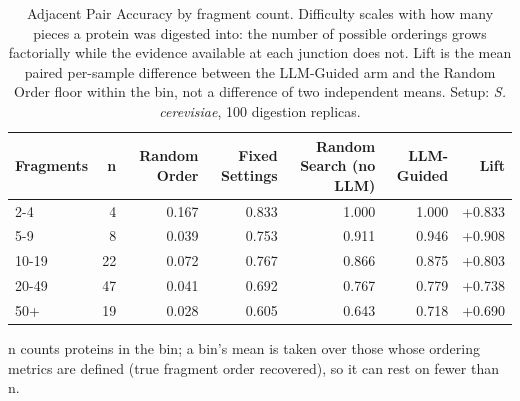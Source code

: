 \begin{table}[!tb]
  \centering
  \caption{Adjacent Pair Accuracy by fragment count. Difficulty scales with how many pieces a protein was digested into: the number of possible orderings grows factorially while the evidence available at each junction does not. Lift is the mean paired per-sample difference between the LLM-Guided arm and the Random Order floor within the bin, not a difference of two independent means. Setup: \textnormal{\textnormal{\textit{S. cerevisiae}}}, 100 digestion replicas.}
  \label{tab:stratification_yeast_r100}
  \begin{tabular}{lrrrrrr}
    \toprule
    Fragments & n & Random Order & Fixed Settings & Random Search (no LLM) & LLM-Guided & Lift \\
    \midrule
    2-4 & 4 & 0.167 & 0.833 & 1.000 & 1.000 & +0.833 \\
    5-9 & 8 & 0.039 & 0.753 & 0.911 & 0.946 & +0.908 \\
    10-19 & 22 & 0.072 & 0.767 & 0.866 & 0.875 & +0.803 \\
    20-49 & 47 & 0.041 & 0.692 & 0.767 & 0.779 & +0.738 \\
    50+ & 19 & 0.028 & 0.605 & 0.643 & 0.718 & +0.690 \\
    \bottomrule
  \end{tabular}
  \par\smallskip\footnotesize{n counts proteins in the bin; a bin's mean is taken over those whose ordering metrics are defined (true fragment order recovered), so it can rest on fewer than n.}
\end{table}
